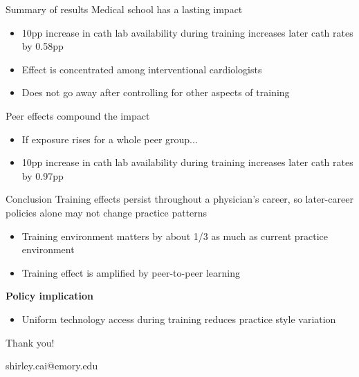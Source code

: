 \documentclass[10pt,aspectratio=169]{beamer}
\begin{document}
\begin{frame}{Summary of results}
    Medical school has a lasting impact
        \begin{itemize}
            \item 10pp increase in cath lab availability during training increases later cath rates by 0.58pp
            \item Effect is concentrated among interventional cardiologists
            \item Does not go away after controlling for other aspects of training
        \end{itemize}

    \vspace{5mm}
    Peer effects compound the impact 
        \begin{itemize}
            \item If exposure rises for a whole peer group...
            \item 10pp increase in cath lab availability during training increases later cath rates by 0.97pp
        \end{itemize}
\end{frame}

\begin{frame}[label=conclusion]{Conclusion}
    Training effects persist throughout a physician's career, so later-career policies alone may not change practice patterns
        \begin{itemize}
            \item Training environment matters by about 1/3 as much as current practice environment \hyperlink{back-of-the-envelope}{}
            \item Training effect is amplified by peer-to-peer learning 
        \end{itemize}

    \vspace{10mm}
    \textbf{Policy implication}
    \begin{itemize}
        \item Uniform technology access during training reduces practice style variation
    \end{itemize}
\end{frame}

\begin{frame}[standout]
    \Large Thank you! 
    
    \vspace{5mm}
    \small shirley.cai@emory.edu
\end{frame}
\end{document}
